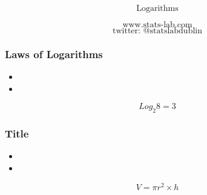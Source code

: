 \documentclass{beamer}
\begin{document}
\begin{frame}

{
\Huge
\[\mbox{Logarithms} \]
}
{
\Large

\[\mbox{www.stats-lab.com} \]
\[ \mbox{twitter: @statslabdublin} \] 

}
\end{frame}
\begin{frame}
\frametitle{Laws of Logarithms}
{
\Large
\begin{itemize}
\item
\item
\end{itemize}
}
{
\Huge
\[Log_2 8 =3 \]
}
\end{frame}

\begin{frame}
\frametitle{Title}
{
\Large
\begin{itemize}
\item
\item
\end{itemize}
}
{
\Huge
\[V = \pi r^2  \times h \]
}
\end{frame}
\end{document}

